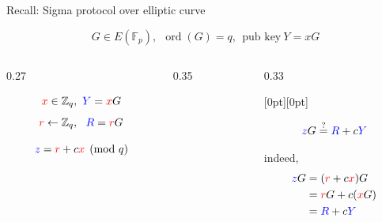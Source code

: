 \documentclass{beamer}
\theoremstyle{customstyle}
\begin{document}
\begin{frame}{Recall: Sigma protocol over elliptic curve}

\scriptsize

\vspace*{-1.0cm}
$$
G \in E(\mathbb{F}_p),
~~
\operatorname{ord}(G)=q,
~~
\text{pub key}~ Y=xG
$$

\begin{columns}[c,onlytextwidth]

\begin{column}{0.27\textwidth}

\vspace*{-1.8cm}
$$\textcolor{red}{x} \in \mathbb{Z}_q, ~ \textcolor{blue}{Y}=\textcolor{red}{x}G$$
$$\textcolor{red}{r} \leftarrow \mathbb{Z}_q, ~~ \textcolor{blue}{R}=\textcolor{red}{r}G$$

$$\textcolor{blue}{z} =\textcolor{red}{r}+c\textcolor{red}{x} \pmod q$$

\end{column}


\begin{column}{0.35\textwidth}

\hspace*{-1.0cm}

\end{column}

\begin{column}{0.33\textwidth}



\raisebox{-1.4cm}[0pt][0pt]{%
}


\vspace*{2.5cm}
$$\textcolor{blue}{z}G \stackrel{?}{=} \textcolor{blue}{R}+c\textcolor{blue}{Y}$$

indeed,
\begin{align*}
  \textcolor{blue}{z}G &= (\textcolor{red}{r}+c\textcolor{red}{x})G \\
   &= \textcolor{red}{r}G+c(\textcolor{red}{x}G) \\
   &= \textcolor{blue}{R}+c\textcolor{blue}{Y}
\end{align*}

\end{column}
\end{columns}
\end{frame}
\end{document}
